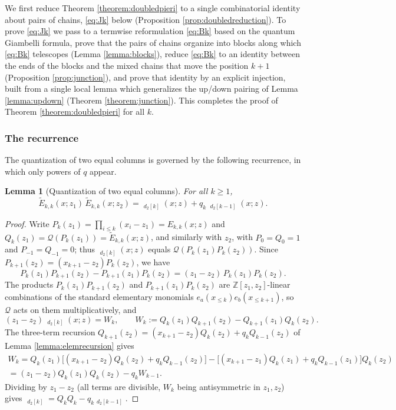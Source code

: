 \documentclass{amsart}
\newtheorem{lemma}{Lemma}[section]
\theoremstyle{definition}
\theoremstyle{remark}
\numberwithin{equation}{section}
\DeclareMathOperator{\qsch}{\widetilde{\mathfrak{S}}}
\newcommand{\qelem}{\widetilde{E}}
\begin{document}
We first reduce Theorem \ref{theorem:doubledpieri} to a single combinatorial identity about pairs of chains, \eqref{eq:Jk} below (Proposition \ref{prop:doubledreduction}). To prove \eqref{eq:Jk} we pass to a termwise reformulation \eqref{eq:Bk} based on the quantum Giambelli formula, prove that the pairs of chains organize into blocks along which \eqref{eq:Bk} telescopes (Lemma \ref{lemma:blocks}), reduce \eqref{eq:Bk} to an identity between the ends of the blocks and the mixed chains that move the position $k+1$ (Proposition \ref{prop:junction}), and prove that identity by an explicit injection, built from a single local lemma which generalizes the up/down pairing of Lemma \ref{lemma:updown} (Theorem \ref{theorem:junction}). This completes the proof of Theorem \ref{theorem:doubledpieri} for all $k$.

\subsubsection*{The recurrence}

The quantization of two equal columns is governed by the following recurrence, in which only powers of $q$ appear.

\begin{lemma}[Quantization of two equal columns] \label{lemma:thetaPP}
For all $k\geq1$,
$$\qelem_{k,k}(x;z_1)\,\qelem_{k,k}(x;z_2)=\qsch_{d_2[k]}(x;z)+q_k\,\qsch_{d_2[k-1]}(x;z).$$
\end{lemma}
\begin{proof}
Write $P_k(z_1)=\prod_{i\leq k}(x_i-z_1)=E_{k,k}(x;z)$ and $Q_k(z_1)=\mathcal Q(P_k(z_1))=\qelem_{k,k}(x;z)$, and similarly with $z_2$, with $P_0=Q_0=1$ and $P_{-1}=Q_{-1}=0$; thus $\qsch_{d_2[k]}(x;z)$ equals $\mathcal Q(P_k(z_1)P_k(z_2))$. Since $P_{k+1}(z_2)=(x_{k+1}-z_2)P_k(z_2)$, we have
$$P_k(z_1)P_{k+1}(z_2)-P_{k+1}(z_1)P_k(z_2)=(z_1-z_2)\,P_k(z_1)P_k(z_2).$$
The products $P_k(z_1)P_{k+1}(z_2)$ and $P_{k+1}(z_1)P_k(z_2)$ are $\mathbb Z[z_1,z_2]$-linear combinations of the standard elementary monomials $e_a(x_{\leq k})e_b(x_{\leq k+1})$, so $\mathcal Q$ acts on them multiplicatively, and
$$(z_1-z_2)\,\qsch_{d_2[k]}(x;z)=W_k,\qquad W_k:=Q_k(z_1)Q_{k+1}(z_2)-Q_{k+1}(z_1)Q_k(z_2).$$
The three-term recursion $Q_{k+1}(z_2)=(x_{k+1}-z_2)Q_k(z_2)+q_kQ_{k-1}(z_2)$ of Lemma \ref{lemma:elemrecursion} gives
\begin{multline*}
W_k=Q_k(z_1)\big[(x_{k+1}-z_2)Q_k(z_2)+q_kQ_{k-1}(z_2)\big]-\big[(x_{k+1}-z_1)Q_k(z_1)+q_kQ_{k-1}(z_1)\big]Q_k(z_2)\\
=(z_1-z_2)Q_k(z_1)Q_k(z_2)-q_kW_{k-1}.
\end{multline*}
Dividing by $z_1-z_2$ (all terms are divisible, $W_k$ being antisymmetric in $z_1,z_2$) gives $\qsch_{d_2[k]}=Q_kQ_k-q_k\qsch_{d_2[k-1]}$.
\end{proof}
\end{document}
